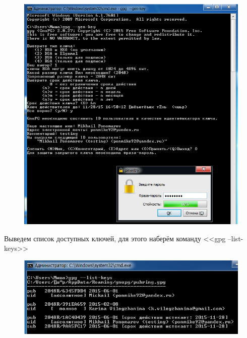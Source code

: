 \documentclass[utf8x, 12pt]{G7-32}
\begin{document}
\begin{figure}[hhh!]
	\begin{center}
		\includegraphics[width=12cm]{img/8_1}
	\end{center}
\end{figure}	


Выведем список доступных ключей, для этого наберём команду \linebreak <<gpg --list-keys>>

\begin{figure}[hhh!]
	\begin{center}
		\includegraphics[width=12cm]{img/8_2}
	\end{center}
\end{figure}	
\end{document}
